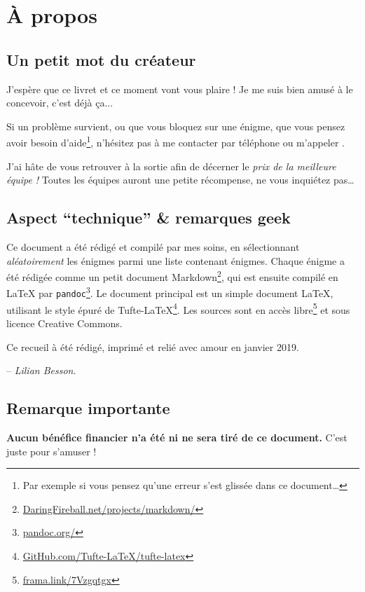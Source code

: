 \chapter{À propos}

\section*{Un petit mot du créateur}

J'espère que ce livret et ce moment vont vous plaire !
Je me suis bien amusé à le concevoir, c'est déjà ça...

Si un problème survient, ou que vous bloquez sur une énigme, que vous pensez avoir besoin d'aide\footnote{Par exemple si vous pensez qu'une erreur s'est glissée dans ce document…}, n'hésitez pas à me contacter par téléphone ou m'appeler
.

J'ai hâte de vous retrouver à la sortie afin de décerner le \emph{prix de la meilleure équipe !}
Toutes les équipes auront une petite récompense, ne vous inquiétez pas…


\section*{Aspect ``technique'' \& remarques geek}
Ce document a été rédigé et compilé par mes soins, en sélectionnant \emph{aléatoirement} les \nbenigmes{} énigmes parmi une liste contenant \totalnbenigmes{} énigmes.
%
Chaque énigme a été rédigée comme un petit document Markdown\footnote{\url{DaringFireball.net/projects/markdown/}},
qui est ensuite compilé en \LaTeX{} par \texttt{pandoc}\footnote{\url{pandoc.org/}}.
%
Le document principal est un simple document \LaTeX,
utilisant le style épuré de Tufte-\LaTeX{}\footnote{\url{GitHub.com/Tufte-LaTeX/tufte-latex}}.
%
Les sources sont en accès libre\footnote{\url{frama.link/7Vzgqtgx}} et sous licence Creative Commons.

Ce recueil à été rédigé, imprimé et relié avec amour en janvier 2019.


\hfill{} -- \emph{Lilian Besson}.

\section*{Remarque importante}
\textbf{Aucun bénéfice financier n'a été ni ne sera tiré de ce document.}
C'est juste pour s'amuser !
